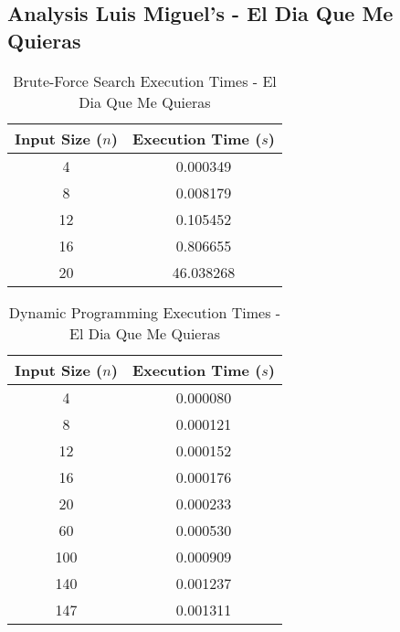 \documentclass[conference]{IEEEtran}
\begin{document}
\subsection{Analysis Luis Miguel's - El Dia Que Me Quieras}
\begin{table}[H]
    \centering 
    \caption{Brute-Force Search Execution Times - El Dia Que Me Quieras}
    \renewcommand{\arraystretch}{1.2} %
    \setlength{\tabcolsep}{3pt} %
    \begin{tabular}{|c|c|}
        \hline 
        \textbf{Input Size ($n$)} & \textbf{Execution Time ($s$)} \\
        \hline 
        4 & 0.000349 \\
        \hline 
        8 & 0.008179 \\
        \hline 
        12 & 0.105452 \\
        \hline 
        16 & 0.806655 \\
        \hline 
        20 & 46.038268 \\
        \hline
    \end{tabular}
\end{table}
\begin{table}[H]
    \centering
    \caption{Dynamic Programming Execution Times - El Dia Que Me Quieras}
    \renewcommand{\arraystretch}{1.2} %
    \setlength{\tabcolsep}{3pt} %
    \begin{tabular}{|c|c|}
        \hline 
        \textbf{Input Size ($n$)} & \textbf{Execution Time ($s$)} \\
        \hline 
        4 & 0.000080 \\
        \hline 
        8 & 0.000121 \\
        \hline 
        12 & 0.000152 \\
        \hline 
        16 & 0.000176 \\
        \hline 
        20 & 0.000233 \\
        \hline 
        60 & 0.000530 \\
        \hline 
        100 & 0.000909 \\
        \hline
        140 & 0.001237 \\
        \hline
        147 & 0.001311 \\
        \hline
    \end{tabular}
\end{table}
\end{document}
